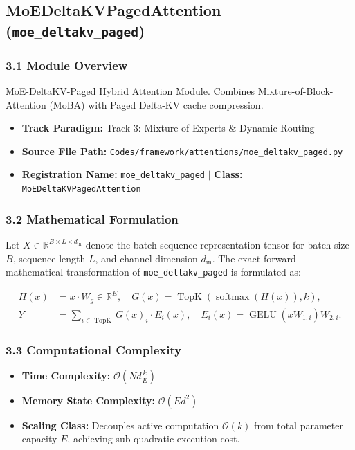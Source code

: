 \subsection{MoEDeltaKVPagedAttention (\texttt{moe\_deltakv\_paged})}
\label{sec:app_module_moe_deltakv_paged}

\subsubsection*{3.1 Module Overview}
MoE-DeltaKV-Paged Hybrid Attention Module. Combines Mixture-of-Block-Attention (MoBA) with Paged Delta-KV cache compression.
\begin{itemize}
    \item \textbf{Track Paradigm:} Track 3: Mixture-of-Experts & Dynamic Routing
    \item \textbf{Source File Path:} \texttt{Codes/framework/attentions/moe\_deltakv\_paged.py}
    \item \textbf{Registration Name:} \texttt{moe\_deltakv\_paged} $\mid$ \textbf{Class:} \texttt{MoEDeltaKVPagedAttention}
\end{itemize}

\subsubsection*{3.2 Mathematical Formulation}
Let $X \in \mathbb{R}^{B \times L \times d_{\text{in}}}$ denote the batch sequence representation tensor for batch size $B$, sequence length $L$, and channel dimension $d_{\text{in}}$. The exact forward mathematical transformation of \texttt{moe\_deltakv\_paged} is formulated as:

\begin{align}
H(x) &= x \cdot W_g \in \mathbb{R}^{E}, \quad G(x) = \operatorname{TopK}\left(\operatorname{softmax}(H(x)), k\right), \\
Y &= \sum_{i \in \operatorname{TopK}} G(x)_i \cdot E_i(x), \quad E_i(x) = \operatorname{GELU}(x W_{1, i}) W_{2, i}.
\end{align}


\subsubsection*{3.3 Computational Complexity}
\begin{itemize}
    \item \textbf{Time Complexity:} $\mathcal{O}(N d \frac{k}{E})$
    \item \textbf{Memory State Complexity:} $\mathcal{O}(E d^2)$
    \item \textbf{Scaling Class:} Decouples active computation $\mathcal{O}(k)$ from total parameter capacity $E$, achieving sub-quadratic execution cost.
\end{itemize}


